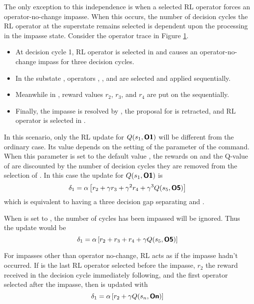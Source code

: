 The only exception to this independence is when a selected RL operator forces an operator-no-change impasse.
When this occurs, the number of decision cycles the RL operator at the superstate remains selected is dependent upon the processing in the impasse state.
Consider the operator trace in Figure \ref{fig:rl-optrace}.

\begin{itemize}
\item At decision cycle 1, RL operator  is selected in  and causes an operator-no-change impass for three decision cycles.
\item In the substate , operators , , and  are selected and applied sequentially.
\item Meanwhile in , reward values $r_2$, $r_3$, and $r_4$ are put on the  sequentially.
\item Finally, the impasse is resolved by , the proposal for  is retracted, and RL operator  is selected in .
\end{itemize}

\begin{figure}
\label{fig:rl-optrace}
\end{figure}

In this scenario, only the RL update for $Q(s_1, \soarb{O1})$ will be different from the ordinary case.
Its value depends on the setting of the  parameter of the  command.
When this parameter is set to the default value , the rewards on  and the Q-value of  are discounted by the number of decision cycles they are removed from the selection of .
In this case the update for $Q(s_1, \soarb{O1})$ is
$$\delta_1 = \alpha \left[ r_2 + \gamma r_3 + \gamma^2 r_4 + \gamma^3 Q(s_5, \soarb{O5}) \right]$$
which is equivalent to having a three decision gap separating  and .

When  is set to , the number of cycles  has been impassed will be ignored.
Thus the update would be
$$\delta_1 = \alpha \left[ r_2 + r_3 + r_4 + \gamma Q(s_5, \soarb{O5}) \right]$$

For impasses other than operator no-change, RL acts as if the impasse hadn't occurred.
If  is the last RL operator selected before the impasse, $r_2$ the reward received in the decision cycle immediately following, and  the first operator selected after the impasse, then  is updated with 
$$\delta_1 = \alpha \left[ r_2 + \gamma Q(s_n, \soarb{On}) \right]$$

